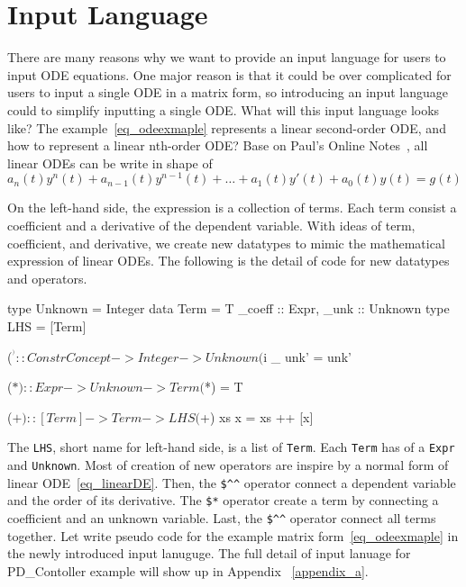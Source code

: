 \section{Input Language}
\label{sec_input}
There are many reasons why we want to provide an input language for users to input ODE equations. One major reason is that it could be over complicated for users to input a single ODE in a matrix form, so introducing an input language could to simplify inputting a single ODE. What will this input language looks like? The example~\ref{eq_odeexmaple} represents a linear second-order ODE, and how to represent a linear nth-order ODE? Base on Paul's Online Notes~\citep{paullinearode}, all linear ODEs can be write in shape of 
\begin{equation} \label{eq_linearDE}
	a_n(t)y^n(t) + a_{n-1}(t)y^{n-1}(t) + \dots + a_1(t)y'(t) + a_0(t)y(t) = g(t)
\end{equation}

On the left-hand side, the expression is a collection of terms. Each term consist a coefficient and a derivative of the dependent variable. With ideas of term, coefficient, and derivative, we create new datatypes to mimic the mathematical expression of linear ODEs. The following is the detail of code for new datatypes and operators.

\begin{haskell1}
type Unknown = Integer
data Term = T{
	_coeff :: Expr,
	_unk :: Unknown
}
type LHS = [Term]

($^^) :: ConstrConcept -> Integer -> Unknown
($^^) _ unk' = unk'

($*) :: Expr -> Unknown -> Term
($*) = T

($+) :: [Term] -> Term -> LHS
($+) xs x  = xs ++ [x]
\end{haskell1}

The \verb|LHS|, short name for left-hand side, is a list of \verb|Term|. Each \verb|Term| has of a \verb|Expr| and \verb|Unknown|. Most of creation of new operators are inspire by a normal form of linear ODE~\ref{eq_linearDE}. Then, the \verb|$^^| operator connect a dependent variable and the order of its derivative. The \verb|$*| operator create a term by connecting a coefficient and an unknown variable. Last, the \verb|$^^| operator connect all terms together. Let write pseudo code for the example matrix form~\ref{eq_odeexmaple} in the newly introduced input lanuguge. The full detail of input lanuage for PD\_Contoller example will show up in Appendix ~\ref{appendix_a}.

